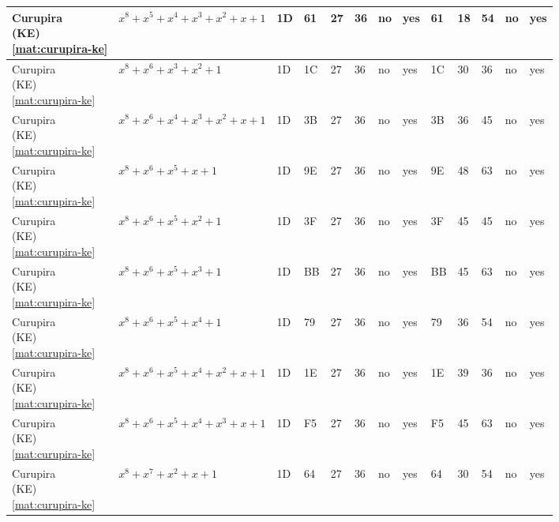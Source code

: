 \begin{tiny}
\begin{longtable}{|l|l|l|l|l|l|l|l|l|l|l|l|l|}
\shortstack{Curupira \\ (KE) \\ \eqref{mat:curupira-ke}} & $x^8 + x^5 + x^4 + x^3 + x^2 + x + 1$ & 1D & 61 & 27 & 36 & no & yes & 61 & 18 & 54 & no & yes \\ \hline
\shortstack{Curupira \\ (KE) \\ \eqref{mat:curupira-ke}} & $x^8 + x^6 + x^3 + x^2 + 1$ & 1D & 1C & 27 & 36 & no & yes & 1C & 30 & 36 & no & yes \\ \hline
\shortstack{Curupira \\ (KE) \\ \eqref{mat:curupira-ke}} & $x^8 + x^6 + x^4 + x^3 + x^2 + x + 1$ & 1D & 3B & 27 & 36 & no & yes & 3B & 36 & 45 & no & yes \\ \hline
\shortstack{Curupira \\ (KE) \\ \eqref{mat:curupira-ke}} & $x^8 + x^6 + x^5 + x + 1$ & 1D & 9E & 27 & 36 & no & yes & 9E & 48 & 63 & no & yes \\ \hline
\shortstack{Curupira \\ (KE) \\ \eqref{mat:curupira-ke}} & $x^8 + x^6 + x^5 + x^2 + 1$ & 1D & 3F & 27 & 36 & no & yes & 3F & 45 & 45 & no & yes \\ \hline
\shortstack{Curupira \\ (KE) \\ \eqref{mat:curupira-ke}} & $x^8 + x^6 + x^5 + x^3 + 1$ & 1D & BB & 27 & 36 & no & yes & BB & 45 & 63 & no & yes \\ \hline
\shortstack{Curupira \\ (KE) \\ \eqref{mat:curupira-ke}} & $x^8 + x^6 + x^5 + x^4 + 1$ & 1D & 79 & 27 & 36 & no & yes & 79 & 36 & 54 & no & yes \\ \hline
\shortstack{Curupira \\ (KE) \\ \eqref{mat:curupira-ke}} & $x^8 + x^6 + x^5 + x^4 + x^2 + x + 1$ & 1D & 1E & 27 & 36 & no & yes & 1E & 39 & 36 & no & yes \\ \hline
\shortstack{Curupira \\ (KE) \\ \eqref{mat:curupira-ke}} & $x^8 + x^6 + x^5 + x^4 + x^3 + x + 1$ & 1D & F5 & 27 & 36 & no & yes & F5 & 45 & 63 & no & yes \\ \hline
\shortstack{Curupira \\ (KE) \\ \eqref{mat:curupira-ke}} & $x^8 + x^7 + x^2 + x + 1$ & 1D & 64 & 27 & 36 & no & yes & 64 & 30 & 54 & no & yes \\ \hline

\end{longtable}
\end{tiny}
